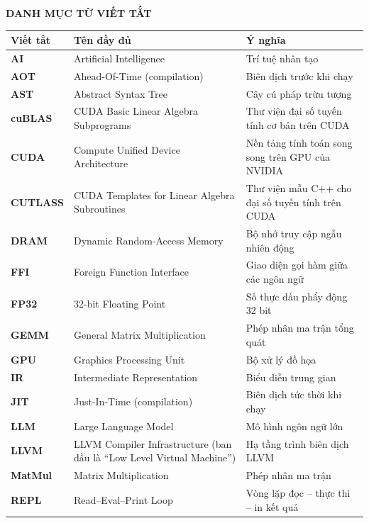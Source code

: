 \documentclass[a4paper]{article}
\begin{document}
    \vspace{10cm}
	\vspace{18pt}
	\begin{center}
		\textbf{DANH MỤC TỪ VIẾT TẮT}
	\end{center}
	\vspace{-6pt}
	\begin{center}
		\renewcommand{\arraystretch}{1.15}
		\begin{tabular}{>{\bfseries}l p{6.2cm} p{6.2cm}}
			\toprule
			\textbf{Viết tắt} & \textbf{Tên đầy đủ} & \textbf{Ý nghĩa} \\
			\midrule
			AI      & Artificial Intelligence & Trí tuệ nhân tạo \\
			AOT     & Ahead-Of-Time (compilation) & Biên dịch trước khi chạy \\
			AST     & Abstract Syntax Tree & Cây cú pháp trừu tượng \\
			cuBLAS  & CUDA Basic Linear Algebra Subprograms & Thư viện đại số tuyến tính cơ bản trên CUDA \\
			CUDA    & Compute Unified Device Architecture & Nền tảng tính toán song song trên GPU của NVIDIA \\
			CUTLASS & CUDA Templates for Linear Algebra Subroutines & Thư viện mẫu C++ cho đại số tuyến tính trên CUDA \\
			DRAM    & Dynamic Random-Access Memory & Bộ nhớ truy cập ngẫu nhiên động \\
			FFI     & Foreign Function Interface & Giao diện gọi hàm giữa các ngôn ngữ \\
			FP32    & 32-bit Floating Point & Số thực dấu phẩy động 32 bit \\
			GEMM    & General Matrix Multiplication & Phép nhân ma trận tổng quát \\
			GPU     & Graphics Processing Unit & Bộ xử lý đồ họa \\
			IR      & Intermediate Representation & Biểu diễn trung gian \\
			JIT     & Just-In-Time (compilation) & Biên dịch tức thời khi chạy \\
			LLM     & Large Language Model & Mô hình ngôn ngữ lớn \\
			LLVM    & LLVM Compiler Infrastructure (ban đầu là ``Low Level Virtual Machine'') & Hạ tầng trình biên dịch LLVM \\
			MatMul  & Matrix Multiplication & Phép nhân ma trận \\
			REPL    & Read--Eval--Print Loop & Vòng lặp đọc -- thực thi -- in kết quả \\
			\bottomrule
		\end{tabular}
	\end{center}
	
\end{document}
